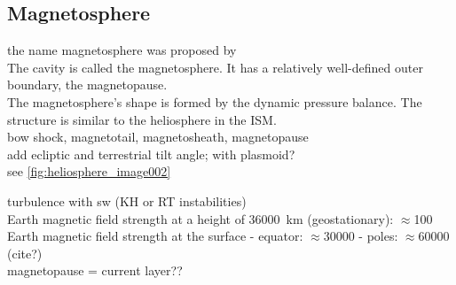 \subsection{Magnetosphere}
\label{sec:magnetosphere}

the name magnetosphere was proposed by \citet{Gold1959}\\

The cavity is called the magnetosphere. It has a relatively well-defined outer boundary, the magnetopause.\\

The magnetosphere's shape is formed by the dynamic pressure balance. The structure is similar to the heliosphere in the ISM.\\

bow shock, magnetotail, magnetosheath, magnetopause\\
add ecliptic and terrestrial tilt angle; with plasmoid?\\
see \autoref{fig:heliosphere_image002}\\
\begin{figure}[htb]
\end{figure}

turbulence with sw (KH or RT instabilities)\\

Earth magnetic field strength at a height of \SI{36000}{\km} (geostationary): $\approx$\SI{100}{\nT}\\
Earth magnetic field strength at the surface - equator: $\approx$\SI{30000}{\nT} - poles: $\approx$\SI{60000}{\nT} (cite?)\\

magnetopause = current layer??\\


